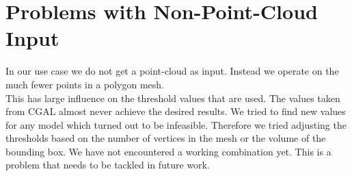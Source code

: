 \documentclass[../ClassicThesis.tex]{subfiles}
\begin{document}
\section{Problems with Non-Point-Cloud Input}
In our use case we do not get a point-cloud as input. Instead we operate on the much fewer points in a polygon mesh.\\
This has large influence on the threshold values that are used. The values taken from CGAL almost never achieve the desired results. We tried to find new values for any model which turned out to be infeasible. Therefore we tried adjusting the thresholds based on the number of vertices in the mesh or the volume of the bounding box. We have not encountered a working combination yet. This is a problem that needs to be tackled in future work.
\end{document}
